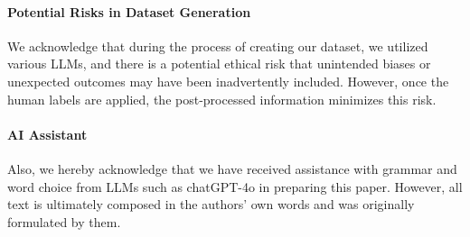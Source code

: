 \paragraph{Potential Risks in Dataset Generation}
We acknowledge that during the process of creating our dataset, we utilized various LLMs, and there is a potential ethical risk that unintended biases or unexpected outcomes may have been inadvertently included. However, once the human labels are applied, the post-processed information minimizes this risk.

\paragraph{AI Assistant} Also, we hereby acknowledge that we have received assistance with grammar and word choice from LLMs such as chatGPT-4o in preparing this paper. However, all text is ultimately composed in the authors’ own words and was originally formulated by them.